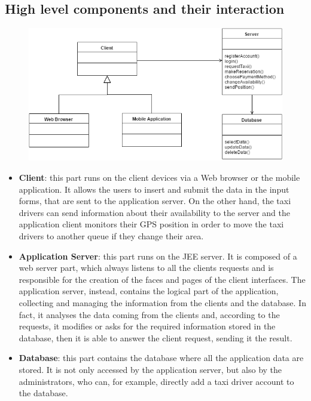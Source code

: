 		\subsection{High level components and their interaction}
			\vspace{1cm}
			\begin{figure}[h]
				\centering
				\includegraphics[scale=0.45]{Diagrams/HighLevelComp2.png}
			\end{figure}
			\vspace{1cm}
			\begin{itemize}
				\item \textbf{Client}: this part runs on the client devices via a Web browser or the mobile application. It allows the users to insert and submit the data in the input forms, that are sent to the application server. On the other hand, the taxi drivers can send information about their availability to the server and the application client monitors their GPS position in order to move the taxi drivers to another queue if they change their area. 
				\item \textbf{Application Server}: this part runs on the JEE server. It is composed of a web server part, which always listens to all the clients requests and is responsible for the creation of the faces and pages of the client interfaces. The application server, instead, contains the logical part of the application, collecting and managing the information from the clients and the database. In fact, it analyses the data coming from the clients and, according to the requests, it modifies or asks for the required information stored in the database, then it is able to answer the client request, sending it the result.  
				\item \textbf{Database}: this part contains the database where all the application data are stored. It is not only accessed by the application server, but also by the administrators, who can, for example, directly add a taxi driver account to the database. 
			\end{itemize}	
			
